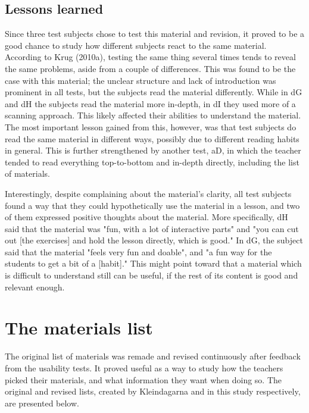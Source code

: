 \subsection{Lessons learned}

Since three test subjects chose to test this material and revision, it proved to be a good chance to study how different subjects react to the same material. According to Krug (2010a), testing the same thing several times tends to reveal the same problems, aside from a couple of differences. This was found to be the case with this material; the unclear structure and lack of introduction was prominent in all tests, but the subjects read the material differently. While in dG and dH the subjects read the material more in-depth, in dI they used more of a scanning approach. This likely affected their abilities to understand the material. The most important lesson gained from this, however, was that test subjects do read the same material in different ways, possibly due to different reading habits in general. This is further strengthened by another test, aD, in which the teacher tended to read everything top-to-bottom and in-depth directly, including the list of materials.

Interestingly, despite complaining about the material's clarity, all test subjects found a way that they could hypothetically use the material in a lesson, and two of them expressed positive thoughts about the material. More specifically, dH said that the material was "fun, with a lot of interactive parts" and "you can cut out [the exercises] and hold the lesson directly, which is good." In dG, the subject said that the material "feels very fun and doable", and "a fun way for the students to get a bit of a [habit]." This might point toward that a material which is difficult to understand still can be useful, if the rest of its content is good and relevant enough.

\section{The materials list} \vspace{-0.5cm}

The original list of materials was remade and revised continuously after feedback from the usability tests. It proved useful as a way to study how the teachers picked their materials, and what information they want when doing so. The original and revised lists, created by Kleindagarna and in this study respectively, are presented below.

